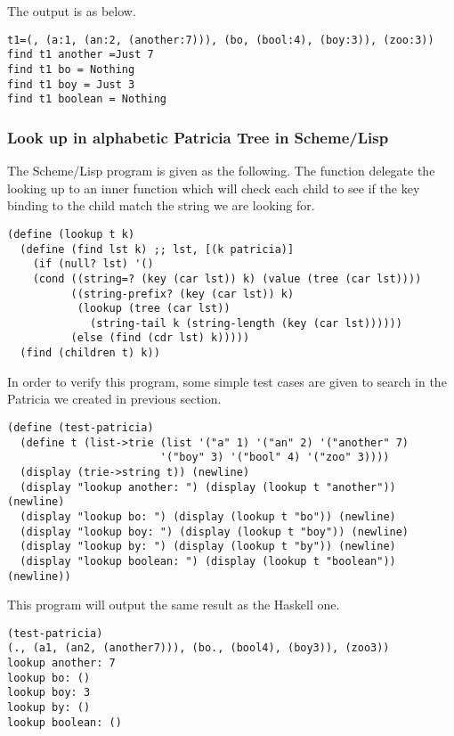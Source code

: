 \documentclass{article}
\begin{document}
The output is as below.

\begin{verbatim}
t1=(, (a:1, (an:2, (another:7))), (bo, (bool:4), (boy:3)), (zoo:3))
find t1 another =Just 7
find t1 bo = Nothing
find t1 boy = Just 3
find t1 boolean = Nothing
\end{verbatim}


\subsubsection*{Look up in alphabetic Patricia Tree in Scheme/Lisp}

The Scheme/Lisp program is given as the following. The function
delegate the looking up to an inner function which will check each
child to see if the key binding to the child match the string we are
looking for.

\lstset{language=lisp}
\begin{lstlisting}
(define (lookup t k)
  (define (find lst k) ;; lst, [(k patricia)]
    (if (null? lst) '()
	(cond ((string=? (key (car lst)) k) (value (tree (car lst))))
	      ((string-prefix? (key (car lst)) k)
	       (lookup (tree (car lst))
		     (string-tail k (string-length (key (car lst))))))
	      (else (find (cdr lst) k)))))
  (find (children t) k))
\end{lstlisting}

In order to verify this program, some simple test cases are given to
search in the Patricia we created in previous section.

\begin{lstlisting}
(define (test-patricia)
  (define t (list->trie (list '("a" 1) '("an" 2) '("another" 7)
                        '("boy" 3) '("bool" 4) '("zoo" 3))))
  (display (trie->string t)) (newline)
  (display "lookup another: ") (display (lookup t "another")) (newline)
  (display "lookup bo: ") (display (lookup t "bo")) (newline)
  (display "lookup boy: ") (display (lookup t "boy")) (newline)
  (display "lookup by: ") (display (lookup t "by")) (newline)
  (display "lookup boolean: ") (display (lookup t "boolean")) (newline))
\end{lstlisting}

This program will output the same result as the Haskell one.

\begin{lstlisting}
(test-patricia)
(., (a1, (an2, (another7))), (bo., (bool4), (boy3)), (zoo3))
lookup another: 7
lookup bo: ()
lookup boy: 3
lookup by: ()
lookup boolean: ()
\end{lstlisting}
\end{document}
